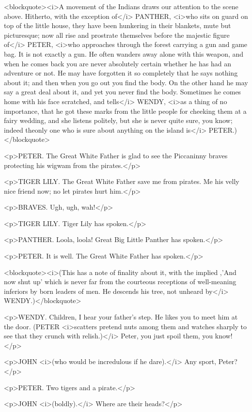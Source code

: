 <blockquote><i>A movement of the Indians draws our attention to the scene above. Hitherto, with the exception of</i> PANTHER, <i>who sits on guard on top of the little house, they have been hunkering in their blankets, mute but picturesque; now all rise and prostrate themselves before the majestic figure of</i> PETER, <i>who approaches through the forest carrying a gun and game bag. It is not exactly a gun. He often wanders away alone with this weapon, and when he comes back you are never absolutely certain whether he has had an adventure or not. He may have forgotten it so completely that he says nothing about it; and then when you go out you find the body. On the other hand he may say a great deal about it, and yet you never find the body. Sometimes he comes home with his face scratched, and tells</i> WENDY, <i>as a thing of no importance, that he got these marks from the little people for cheeking them at a fairy wedding, and she listens politely, but she is never quite sure, you know; indeed theonly one who is sure about anything on the island is</i> PETER.)</blockquote>

<p>PETER. The Great White Father is glad to see the Piccaninny braves protecting his wigwam from the pirates.</p>

<p>TIGER LILY. The Great White Father save me from pirates. Me his velly nice friend now; no let pirates hurt him.</p>

<p>BRAVES. Ugh, ugh, wah!</p>

<p>TIGER LILY. Tiger Lily has spoken.</p>

<p>PANTHER. Loola, loola! Great Big Little Panther has spoken.</p>

<p>PETER. It is well. The Great White Father has spoken.</p>

<blockquote><i>(This has a note of finality about it, with the implied ,'And now shut up' which is never far from the courteous receptions of well-meaning inferiors by born leaders of men. He descends his tree, not unheard by</i> WENDY.)</blockquote>

<p>WENDY. Children, I hear your father's step. He likes you to meet him at the door. (PETER <i>scatters pretend nuts among them and watches sharply to see that they crunch with relish.)</i> Peter, you just spoil them, you know!</p>

<p>JOHN <i>(who would be incredulous if he dare).</i> Any sport, Peter?</p>

<p>PETER. Two tigers and a pirate.</p>

<p>JOHN <i>(boldly).</i> Where are their heads?</p>

